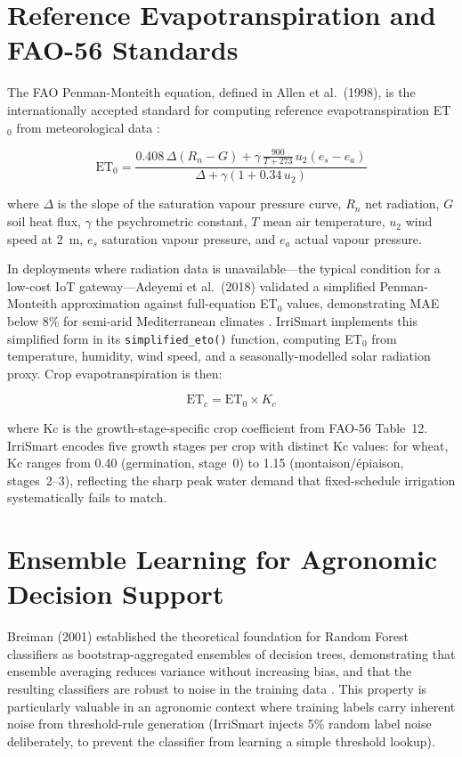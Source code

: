 \documentclass[12pt,a4paper]{report}
\begin{document}
\section{Reference Evapotranspiration and FAO-56 Standards}

The FAO Penman-Monteith equation, defined in Allen et al.\ (1998), is the internationally accepted standard for computing reference evapotranspiration ET$_0$ from meteorological data \cite{allen1998}:

\begin{equation}
  \text{ET}_0 = \frac{0.408\,\Delta(R_n - G) + \gamma\,\frac{900}{T+273}\,u_2(e_s - e_a)}
                     {\Delta + \gamma(1 + 0.34\,u_2)}
  \label{eq:fao56}
\end{equation}

where $\Delta$ is the slope of the saturation vapour pressure curve, $R_n$ net radiation, $G$ soil heat flux, $\gamma$ the psychrometric constant, $T$ mean air temperature, $u_2$ wind speed at 2~m, $e_s$ saturation vapour pressure, and $e_a$ actual vapour pressure.

In deployments where radiation data is unavailable---the typical condition for a low-cost IoT gateway---Adeyemi et al.\ (2018) validated a simplified Penman-Monteith approximation against full-equation ET$_0$ values, demonstrating MAE below 8\% for semi-arid Mediterranean climates \cite{adeyemi2018}. IrriSmart implements this simplified form in its \texttt{simplified\_eto()} function, computing ET$_0$ from temperature, humidity, wind speed, and a seasonally-modelled solar radiation proxy. Crop evapotranspiration is then:

\begin{equation}
  \text{ET}_c = \text{ET}_0 \times K_c
  \label{eq:etc}
\end{equation}

where Kc is the growth-stage-specific crop coefficient from FAO-56 Table~12. IrriSmart encodes five growth stages per crop with distinct Kc values: for wheat, Kc ranges from 0.40 (germination, stage~0) to 1.15 (montaison/épiaison, stages~2--3), reflecting the sharp peak water demand that fixed-schedule irrigation systematically fails to match.

\section{Ensemble Learning for Agronomic Decision Support}

Breiman (2001) established the theoretical foundation for Random Forest classifiers as bootstrap-aggregated ensembles of decision trees, demonstrating that ensemble averaging reduces variance without increasing bias, and that the resulting classifiers are robust to noise in the training data \cite{breiman2001}. This property is particularly valuable in an agronomic context where training labels carry inherent noise from threshold-rule generation (IrriSmart injects 5\% random label noise deliberately, to prevent the classifier from learning a simple threshold lookup).
\end{document}
